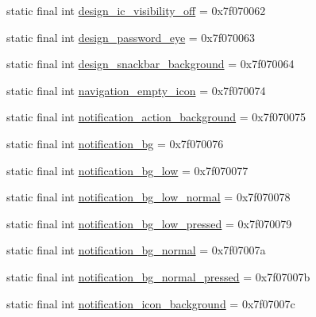 \begin{DoxyCompactItemize}
\item 
static final int \mbox{\hyperlink{classandroid_1_1support_1_1design_1_1_r_1_1drawable_a131e16776a80b5ad521533f34a9a7a19}{design\+\_\+ic\+\_\+visibility\+\_\+off}} = 0x7f070062
\item 
static final int \mbox{\hyperlink{classandroid_1_1support_1_1design_1_1_r_1_1drawable_a43243cac50e3a6a26b7d8c777d1f821f}{design\+\_\+password\+\_\+eye}} = 0x7f070063
\item 
static final int \mbox{\hyperlink{classandroid_1_1support_1_1design_1_1_r_1_1drawable_a814061df3be11306bb3c0cddedfbcf5f}{design\+\_\+snackbar\+\_\+background}} = 0x7f070064
\item 
static final int \mbox{\hyperlink{classandroid_1_1support_1_1design_1_1_r_1_1drawable_a6f048ef7024f80d105eda85246d749f7}{navigation\+\_\+empty\+\_\+icon}} = 0x7f070074
\item 
static final int \mbox{\hyperlink{classandroid_1_1support_1_1design_1_1_r_1_1drawable_a61f589fa0fd573df67b2eb0d8e6c6655}{notification\+\_\+action\+\_\+background}} = 0x7f070075
\item 
static final int \mbox{\hyperlink{classandroid_1_1support_1_1design_1_1_r_1_1drawable_a0c2d9cb674ac7daf1163a496d9b96c61}{notification\+\_\+bg}} = 0x7f070076
\item 
static final int \mbox{\hyperlink{classandroid_1_1support_1_1design_1_1_r_1_1drawable_afda479b62093e1d3f15c2acf374ab4ca}{notification\+\_\+bg\+\_\+low}} = 0x7f070077
\item 
static final int \mbox{\hyperlink{classandroid_1_1support_1_1design_1_1_r_1_1drawable_a7c9ae1f5f999c9d50ef1cffb3376eac8}{notification\+\_\+bg\+\_\+low\+\_\+normal}} = 0x7f070078
\item 
static final int \mbox{\hyperlink{classandroid_1_1support_1_1design_1_1_r_1_1drawable_a998d0007d33ed671c2a54687b465bb74}{notification\+\_\+bg\+\_\+low\+\_\+pressed}} = 0x7f070079
\item 
static final int \mbox{\hyperlink{classandroid_1_1support_1_1design_1_1_r_1_1drawable_a082976ea2611d5e4b06b6bd5bbe33a80}{notification\+\_\+bg\+\_\+normal}} = 0x7f07007a
\item 
static final int \mbox{\hyperlink{classandroid_1_1support_1_1design_1_1_r_1_1drawable_a2b66e6494bd4d535188d64efe5f0d250}{notification\+\_\+bg\+\_\+normal\+\_\+pressed}} = 0x7f07007b
\item 
static final int \mbox{\hyperlink{classandroid_1_1support_1_1design_1_1_r_1_1drawable_a1d77f438c8bcf02cda09af18290aabe5}{notification\+\_\+icon\+\_\+background}} = 0x7f07007c

\end{DoxyCompactItemize}
